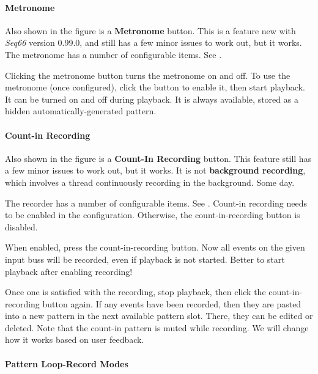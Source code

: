 \paragraph{Metronome}
\label{paragraph:patterns_metronome}

   Also shown in the figure is a \textbf{Metronome} button.
   This is a feature new with \textsl{Seq66} version 0.99.0, and still has a few
   minor issues to work out, but it works.
   The metronome has a number of configurable items.
   See .

   Clicking the metronome button turns the metronome on and off.
   To use the metronome (once configured), click the button to enable it,
   then start playback.
   It can be turned on and off during playback.
   It is always available, stored as a hidden automatically-generated
   pattern.

\paragraph{Count-in Recording}
\label{paragraph:patterns_background_recording}

   Also shown in the figure is a \textbf{Count-In Recording} button.
   This feature still has a few
   minor issues to work out, but it works.
   It is not \textbf{background recording}, which involves a
   thread continuously recording in the background.  Some day.

   The recorder has a number of configurable items.
   See .
   Count-in recording needs to be enabled in the configuration.
   Otherwise, the count-in-recording button is disabled.

   When enabled, press the count-in-recording button.  Now all events on the
   given input buss will be recorded, even if playback is not started.
   Better to start playback after enabling recording!

   Once one is satisfied with the recording, stop playback, then
   click the count-in-recording button again.
   If any events have been recorded, then they are pasted into a new pattern in
   the next available pattern slot.
   There, they can be edited or deleted.
   Note that the count-in pattern is muted while recording.
   We will change how it works based on user feedback.

\paragraph{Pattern Loop-Record Modes}
\label{paragraph:patterns_loop_modes}

